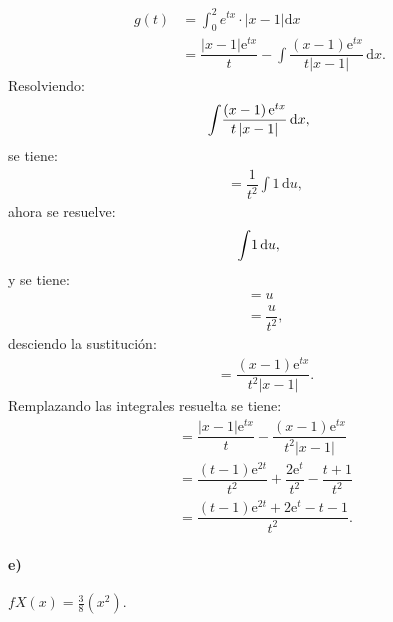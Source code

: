 \documentclass{article}
\begin{document}
\begin{align}
   g(t) &= \displaystyle\int_{0}^2 {e}^{tx}\cdot\left|x-1\right|{\mathrm{d}x}   \\
        &=  \dfrac{\left|x-1\right|\mathrm{e}^{tx}}{t}-{\displaystyle\int}\dfrac{\left(x-1\right)\mathrm{e}^{tx}}{t\left|x-1\right|}\,\mathrm{d}x.
\end{align}
   Resolviendo: 
    \begin{equation*}
        {\displaystyle\int}\dfrac{\left(x-1\right)\mathrm{e}^{tx}}{t\left|x-1\right|}\,\mathrm{d}x,\\
    \end{equation*}
    se tiene:
        \begin{align}
         &= \dfrac{1}{t^2}{\displaystyle\int}1\,\mathrm{d}u,
         \end{align}
          ahora se resuelve: 
    \begin{equation*}
       {\displaystyle\int}1\,\mathrm{d}u,\\
    \end{equation*}  
    y se tiene:
   \begin{align}      
        &= u\\
         &=\dfrac{u}{t^2},
        \end{align}
        desciendo la sustitución:
        \begin{align}  
        &=  \dfrac{\left(x-1\right)\mathrm{e}^{tx}}{t^2\left|x-1\right|}.
\end{align}
Remplazando las integrales resuelta se tiene:
 \begin{align}
 &=\dfrac{\left|x-1\right|\mathrm{e}^{tx}}{t}-\dfrac{\left(x-1\right)\mathrm{e}^{tx}}{t^2\left|x-1\right|}\\
 &= \dfrac{\left(t-1\right)\mathrm{e}^{2t}}{t^2}+\dfrac{2\mathrm{e}^t}{t^2}-\dfrac{t+1}{t^2}\\
  &= \dfrac{\left(t-1\right)\mathrm{e}^{2t}+2\mathrm{e}^t-t-1}{t^2}.
\end{align}

\paragraph{e)}
$fX(x) = \frac{3}{8}(x^{2}).$
\end{document}
